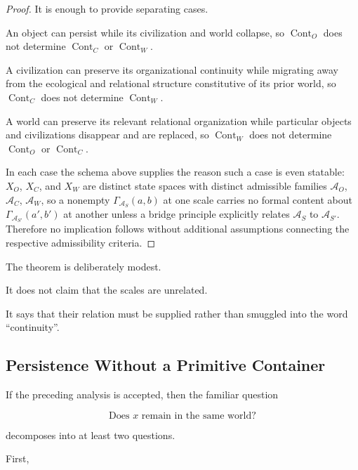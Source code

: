 \documentclass[
  11pt,
  a4paper,
  DIV=12,
  BCOR=0mm,
  parskip=half-
]{scrartcl}
\newcommand{\Cont}{\operatorname{Cont}}
\theoremstyle{definition}
\theoremstyle{plain}
\theoremstyle{remark}
\begin{document}
\begin{proof}
It is enough to provide separating cases.

An object can persist while its civilization and world collapse, so
\(\Cont_O\) does not determine \(\Cont_C\) or \(\Cont_W\).

A civilization can preserve its organizational continuity while migrating
away from the ecological and relational structure constitutive of its prior
world, so \(\Cont_C\) does not determine \(\Cont_W\).

A world can preserve its relevant relational organization while particular
objects and civilizations disappear and are replaced, so \(\Cont_W\) does not
determine \(\Cont_O\) or \(\Cont_C\).

In each case the schema above supplies the reason such a case is even
statable: \(X_O\), \(X_C\), and \(X_W\) are distinct state spaces with
distinct admissible families \(\mathcal A_O\), \(\mathcal A_C\),
\(\mathcal A_W\), so a nonempty \(\Gamma_{\mathcal A_S}(a,b)\) at one scale
carries no formal content about \(\Gamma_{\mathcal A_{S'}}(a',b')\) at
another unless a bridge principle explicitly relates \(\mathcal A_S\) to
\(\mathcal A_{S'}\). Therefore no implication follows without additional
assumptions connecting the respective admissibility criteria.
\end{proof}

The theorem is deliberately modest.

It does not claim that the scales are unrelated.

It says that their relation must be supplied rather than smuggled into the
word \enquote{continuity}.


\subsection{Persistence Without a Primitive Container}
\label{app:no-world-consequence}

If the preceding analysis is accepted, then the familiar question

\[
  \text{Does }x\text{ remain in the same world?}
\]

decomposes into at least two questions.

First,
\end{document}
